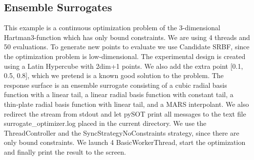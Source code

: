 \documentclass[]{article}
\begin{document}
\subsection{Ensemble Surrogates}
This example is a continuous optimization problem of the 3-dimensional Hartman3-function which has only bound constraints. We are using 4 threads and 50 evaluations. To generate new points to evaluate we use Candidate SRBF, since the optimization problem is low-dimensional. The experimental design is created using a Latin Hypercube with 2dim+1 points. We also add the extra point [0.1, 0.5, 0.8], which we pretend is a known good solution to the problem. The response surface is an ensemble surrogate consisting of a cubic radial basis function with a linear tail, a linear radial basis function with constant tail, a thin-plate radial basis function with linear tail, and a MARS interpolant. We also redirect the stream from stdout and let pySOT print all messages to the text file surrogate\_optimizer.log placed in the current directory. We use the ThreadController and the SyncStrategyNoConstraints strategy, since there are only bound constraints. We launch 4 BasicWorkerThread, start the optimization and finally print the result to the screen.
\end{document}
